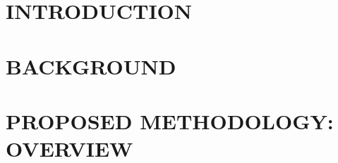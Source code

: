 \documentclass[Dual]{iitddiss}
\begin{document}






\pagebreak
\clearpage




\chapter{INTRODUCTION}
\label{chap:intro}



\chapter{BACKGROUND}
\label{chap:background}



\chapter{PROPOSED METHODOLOGY: OVERVIEW}
\label{chap:outline}
\end{document}
